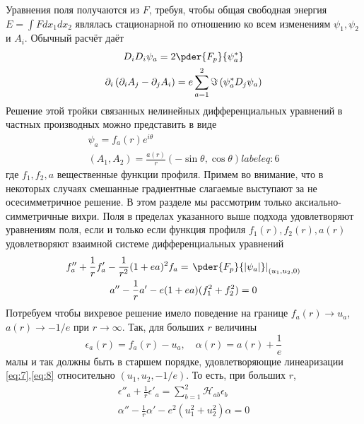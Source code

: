 Уравнения поля получаются из \( F \), требуя, чтобы общая свободная энергия 
\( E = \int F dx_1 dx_2 \) являлась стационарной по отношению ко всем 
изменениям \( \psi_1, \psi_2 \) и \( A_i \). Обычный расчёт даёт 
\begin{gather}
    D_i D_i \psi_a = 2\pder{F_p}{\psi_a^{*}}
    \label{eq:4} \\
    \partial_i \left( \partial_i A_j - \partial_j A_i \right) = 
        e\sum\limits_{a=1}^{2}\Im\left( \psi_a^* D_j \psi_a \right)
    \label{eq:5}
\end{gather}
Решение этой тройки связанных нелинейных дифференциальных уравнений в частных 
производных можно представить в виде
\begin{gather}
    \psi_a = f_a(r)e^{i\theta} \nonumber \\
    (A_1, A_2) = \frac{a(r)}{r}(-\sin\theta, \cos\theta)
    label{eq:6}
\end{gather}
где \( f_1, f_2, a \) вещественные функции профиля. Примем во внимание, что 
в некоторых случаях смешанные градиентные слагаемые выступают за не 
осесимметричное решение. В этом разделе мы рассмотрим только 
аксиально-симметричные вихри. Поля в пределах указанного выше подхода 
удовлетворяют уравнениям поля, если и только если функция профиля 
\( f_1(r), f_2(r), a(r) \) удовлетворяют взаимной системе дифференциальных 
уравнений
\begin{gather}
    f''_a + \frac{1}{r} f'_a - \frac{1}{r^2}(1+ea)^2 f_a = 
        \left. \pder{F_p}{|\psi_a|} \right|_{(u_1, u_2, 0)}
    \label{eq:7} \\
    a'' - \frac{1}{r} a' - e(1+ea)(f_1^2+f_2^2) = 0
    \label{eq:8}
\end{gather}
Потребуем чтобы вихревое решение имело поведение на границе
\( f_a(r) \rightarrow u_a \), \( a(r) \rightarrow -1/e \) при
\( r \rightarrow \infty \). Так, для больших \( r \) величины
\begin{equation}
    \epsilon_a(r) = f_a(r) - u_a, \quad
    \alpha(r) = a(r) + \frac{1}{e}
    \label{eq:9}
\end{equation}
малы и так должны быть в старшем порядке, удовлетворяющие линеаризации 
\eqref{eq:7},\eqref{eq:8} относительно \( (u_1, u_2, -1/e) \). То есть, при 
больших \( r \),
\begin{gather}
    \epsilon''_a + \frac{1}{r} \epsilon'_a = \sum\limits_{b=1}^{2}
        \mathcal{H}_{ab} \epsilon_b
    \label{eq:10} \\
    \alpha'' - \frac{1}{r} \alpha' - e^2(u_1^2 + u_2^2 )\alpha = 0
    \label{eq:11}
\end{gather}

